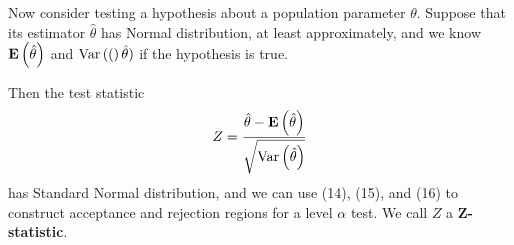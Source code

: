 Now consider testing a hypothesis about a population parameter $\theta$. Suppose that its estimator $\hat{\theta}$ has Normal distribution, at least approximately, and we know $\mathbf{E}\left(\hat{\theta}\right)$ and $\text{Var}\left( ( \right)\hat{\theta})$ if the hypothesis is true.

Then the test statistic
\begin{equation}
  Z = \frac{\hat{\theta} - \mathbf{E}\left(\hat{\theta}\right)}{\sqrt{\text{Var}\left( \hat{\theta} \right)}}
\end{equation}
has Standard Normal distribution, and we can use (14), (15), and (16) to construct acceptance and rejection regions for a level $\alpha$ test. We call $Z$ a \textbf{Z-statistic}.
